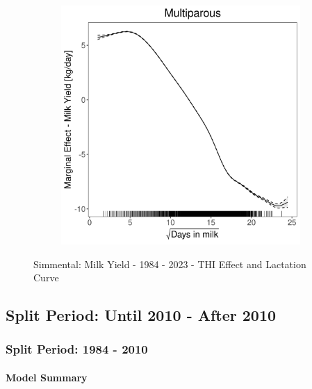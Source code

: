 \begin{figure}[H]
\begin{subfigure}[b]{0.45\textwidth}
    \end{subfigure}
    \hspace{0.05\textwidth} %
    \begin{subfigure}[b]{0.45\textwidth}
        \centering
        \includegraphics[width=\textwidth]{thesis/figures/models/milk/full/si_milk_full/si_milk_full_marginal_dim_milk_multi.png}
    \end{subfigure}
    \caption[]{Simmental: Milk Yield - 1984 - 2023 - THI Effect and Lactation Curve}
    \label{fig:main}
\end{figure}

\subsection{Split Period: Until 2010 - After 2010}
\subsubsection{Split Period: 1984 - 2010}\label{model:si_milk_before}
\paragraph{Model Summary} \quad \\


